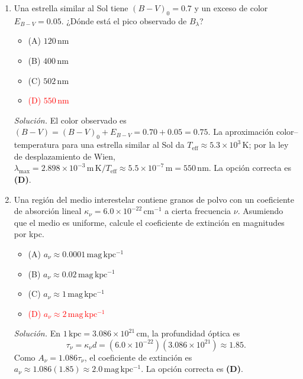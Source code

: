 \documentclass[11pt]{article}
\begin{document}
\begin{enumerate}
    \item Una estrella similar al Sol tiene $(B-V)_0=0.7$ y un exceso de color $E_{B-V}=0.05$. ¿Dónde está el pico observado de $B_\lambda$?
    \begin{itemize}
        \item (A) $120\,\mathrm{nm}$
        \item (B) $400\,\mathrm{nm}$
        \item (C) $502\,\mathrm{nm}$
        \item \textcolor{red}{(D) $550\,\mathrm{nm}$}
    \end{itemize}
    \textit{Solución.} El color observado es $(B-V)=(B-V)_0+E_{B-V}=0.70+0.05=0.75$. La aproximación color--temperatura para una estrella similar al Sol da $T_{\mathrm{eff}}\approx5.3\times10^3\,\mathrm{K}$; por la ley de desplazamiento de Wien, $\lambda_{\max}=2.898\times10^{-3}\,\mathrm{m\,K}/T_{\mathrm{eff}}\approx5.5\times10^{-7}\,\mathrm{m}=550\,\mathrm{nm}$. La opción correcta es \textbf{(D)}. \parencite{chaparro2026}

    \item Una región del medio interestelar contiene granos de polvo con un coeficiente de absorción lineal $\kappa_\nu=6.0\times10^{-22}\,\mathrm{cm^{-1}}$ a cierta frecuencia $\nu$. Asumiendo que el medio es uniforme, calcule el coeficiente de extinción en magnitudes por kpc.
    \begin{itemize}
        \item (A) $a_\nu\approx0.0001\,\mathrm{mag\,kpc^{-1}}$
        \item (B) $a_\nu\approx0.02\,\mathrm{mag\,kpc^{-1}}$
        \item (C) $a_\nu\approx1\,\mathrm{mag\,kpc^{-1}}$
        \item \textcolor{red}{(D) $a_\nu\approx2\,\mathrm{mag\,kpc^{-1}}$}
    \end{itemize}
    \textit{Solución.} En $1\,\mathrm{kpc}=3.086\times10^{21}\,\mathrm{cm}$, la profundidad óptica es
    \[
        \tau_\nu=\kappa_\nu d=(6.0\times10^{-22})(3.086\times10^{21})\approx1.85.
    \]
    Como $A_\nu=1.086\tau_\nu$, el coeficiente de extinción es $a_\nu\approx1.086(1.85)\approx2.0\,\mathrm{mag\,kpc^{-1}}$. La opción correcta es \textbf{(D)}. \parencite{chaparro2026}


\end{enumerate}
\end{document}

